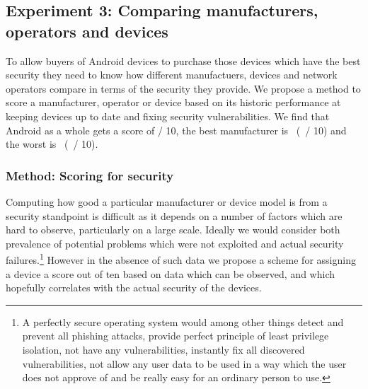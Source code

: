 \subsection{Experiment 3: Comparing manufacturers, operators and devices}
\label{sec:security_scoring}\label{sec:exp:security_score}

To allow buyers of Android devices to purchase those devices which have the best security they need to know how different manufactuers, devices and network operators compare in terms of the security they provide.
We propose a method to score a manufacturer, operator or device based on its historic performance at keeping devices up to date and fixing security vulnerabilities.
We find that Android as a whole gets a score of \daSecurityScore / 10, the best manufacturer is \daSecScoreBestmanufacturer\ (\daSecScoreBestmanufacturerScore\ / 10) and the worst is \daSecScoreWorstmanufacturer\ (\daSecScoreWorstmanufacturerScore\ / 10).

\subsubsection{Method: Scoring for security}

Computing how good a particular manufacturer or device model is from a security standpoint is difficult as it depends on a number of factors which are hard to observe, particularly on a large scale.
Ideally we would consider both prevalence of potential problems which were not exploited and actual security failures.\footnote{A perfectly secure operating system would among other things detect and prevent all phishing attacks, provide perfect principle of least privilege isolation, not have any vulnerabilities, instantly fix all discovered vulnerabilities, not allow any user data to be used in a way which the user does not approve of and be really easy for an ordinary person to use.}
However in the absence of such data we propose a scheme for assigning a device a score out of ten based on data which can be observed, and which hopefully correlates with the actual security of the devices.

